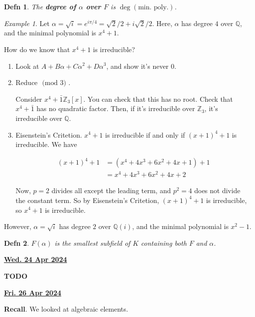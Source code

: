 \documentclass[12pt]{article}
\renewcommand{\date}[1]{\underline{\bf #1}}
\def\Z{{\mathbb Z}}
\def\Q{{\mathbb Q}}
\def\TODO{\color{red}\textbf{TODO}\color{black}}
\renewcommand{\mod}[1]{\text{ (mod $#1$) }}
\newtheorem{definition}{Defn}
\theoremstyle{remark}
\theoremstyle{remark}
\theoremstyle{remark}
\newtheorem{example}{Example}
\theoremstyle{remark}
\theoremstyle{remark}
\begin{document}
\begin{definition}
  The {\bf degree of $\alpha$ over $F$} is $\deg(\text{min. poly.})$.
\end{definition}

\begin{example}
  Let $\alpha = \sqrt{i} = e^{i \pi / 4} = \sqrt{2} / 2 + i \sqrt{2} / 2$. Here,
  $\alpha$ has degree $4$ over $\Q$, and the minimal polynomial is $x^4 + 1$.

  How do we know that $x^4 + 1$ is irreducible?
  \begin{enumerate}
    \item Look at $A + B \alpha + C \alpha^2 + D \alpha^3$, and show it's never
      $0$.
    \item Reduce $\mod 3$.

      Consider $x^4 + \bar 1 \Z_3[x]$. You can check that this has no root.
      Check that $x^4 + \bar 1$ has no quadratic factor. Then, if it's
      irreducible over $\Z_3$, it's irreducible over $\Q$.

    \item Eisenstein's Critetion. $x^4 + 1$ is irreducible if and only if $(x +
      1)^4 + 1$ is irreducible. We have

      \begin{align*}
        (x + 1)^4 + 1 &= (x^4 + 4x^3 + 6x^2 + 4x + 1) + 1 \\
                      &= x^4 + 4x^3 + 6x^2 + 4x + 2
      \end{align*}

      Now, $p = 2$ divides all except the leading term, and $p^2 = 4$ does not
      divide the constant term. So by Eisenstein's Critetion, $(x + 1)^4 + 1$ is
      irreducible, so $x^4 + 1$ is irreducible.
  \end{enumerate}

  However, $\alpha = \sqrt{i}$ has degree $2$ over $\Q(i)$, and the minimal
  polynomial is $x^2 - 1$.
\end{example}

\begin{definition}
  $F(\alpha)$ is the smallest subfield of $K$ containing both $F$ and $\alpha$.
\end{definition}

\date{Wed. 24 Apr 2024}

\TODO

\date{Fri. 26 Apr 2024}

{\bf Recall}. We looked at algebraic elements.
\end{document}
